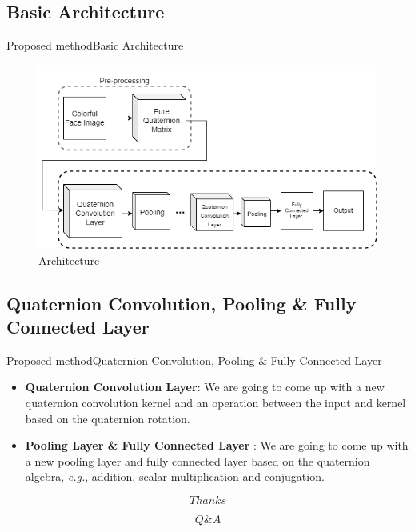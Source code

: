 \documentclass{beamer}
\begin{document}
\subsection{Basic Architecture}
\begin{frame}{Proposed method}{Basic Architecture}
    \begin{figure}[H]
        \centering
        \includegraphics[width=\textwidth]{img/1.png}
        \caption{Architecture}
    \end{figure}
\end{frame}
\subsection{Quaternion Convolution, Pooling \& Fully Connected Layer}
\begin{frame}{Proposed method}{Quaternion Convolution, Pooling \& Fully Connected Layer}
    \begin{itemize}
        \item \textbf{Quaternion Convolution Layer}: We are going to come up with a new quaternion convolution kernel and an operation between the input and kernel based on the quaternion rotation.
        \item \textbf{Pooling Layer \& Fully Connected Layer }: We are going to come up with a new pooling layer and fully connected layer based on the quaternion algebra, \emph{e.g.}, addition, scalar multiplication and conjugation.
    \end{itemize}
\end{frame}
\begin{frame}
    $$Thanks$$
\end{frame}
\begin{frame}
    $$Q\&A$$
\end{frame}

 
\end{document}
